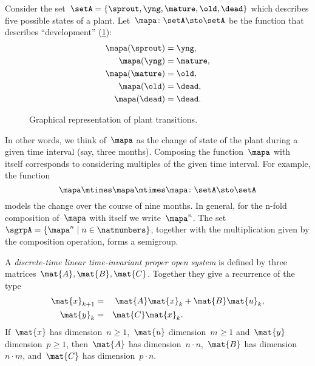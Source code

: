 \begin{example}
    \label{exa:plant-trafo-semigroup}
    Consider the set~$\setA = \{ \sprout, \yng, \mature, \old, \dead \}$ which describes five possible states of a plant.
    Let~$\mapa \colon \setA \sto \setA$ be the function that describes ``development'' (\cref{fig:plants_transitions}):
    \begin{align*}
        \mapa(\sprout) &=  \yng, \\
        \mapa(\yng) &=  \mature, \\
        \mapa(\mature) &=  \old, \\
        \mapa( \old) &= \dead,\\
        \mapa (\dead) &= \dead.
    \end{align*}
    \begin{figure}[h]
        \caption{Graphical representation of plant transitions.}
        \label{fig:plants_transitions}
    \end{figure}
    In other words, we think of~$\mapa$ as the change of state of the plant during a given time interval (say, three months).
    Composing the function~$\mapa$ with itself corresponds to considering multiples of the given time interval.
    For example, the function
    \begin{equation*}
        \mapa \mtimes \mapa \mtimes \mapa \colon \setA \sto \setA
    \end{equation*}
    models the change over the course of nine months.
    In general, for the n-fold composition of~$\mapa$ with itself we write~$\mapa^n$.
    The set~$\sgrpA = \{ \mapa^n \mid n \in \natnumbers \}$, together with the multiplication given by the composition operation, forms a semigroup.
\end{example}

\label{ex:discrete-time-linear}
\begin{definition}
    \label{def:discrete-time-linear-system}
    A \emph{discrete-time linear time-invariant proper open system} is defined by three matrices~$\mat{A},\mat{B},\mat{C}$.
    Together they give a recurrence of the type
    \begin{equation}
        \label{eq:discrete-time-dynamics}
        \begin{aligned}
            \mat{x}_{k+1} &=& \mat{A} \mat{x}_k & + \mat{B} \mat{u}_k,\\
            \mat{y}_{k}   &=& \mat{C} \mat{x}_k.  \\
        \end{aligned}
    \end{equation}
    If~$\mat{x}$ has dimension~$n\geq1$,~$\mat{u}$ dimension~$m\geq1$ and~$\mat{y}$ dimension~$p\geq1$, then~$\mat{A}$ has dimension~$n \cdot n$,~$\mat{B}$ has dimension~$n \cdot m$, and~$\mat{C}$ has dimension~$p \cdot n$.
\end{definition}

